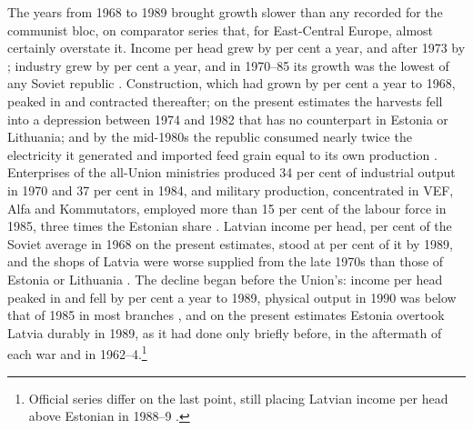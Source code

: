 The years from 1968 to 1989 brought growth slower than any recorded for the communist bloc, on comparator series that, for East-Central Europe, almost certainly overstate it. Income per head grew by  per cent a year, and after 1973 by ; industry grew by  per cent a year, and in 1970--85 its growth was the lowest of any Soviet republic \parencite[304]{krumins_2017_tautsaimnieciba_1960}. Construction, which had grown by  per cent a year to 1968, peaked in  and contracted thereafter; on the present estimates the harvests fell into a depression between 1974 and 1982 that has no counterpart in Estonia or Lithuania; and by the mid-1980s the republic consumed nearly twice the electricity it generated and imported feed grain equal to its own production \parencite[302, 307]{krumins_2017_tautsaimnieciba_1960}. Enterprises of the all-Union ministries produced 34 per cent of industrial output in 1970 and 37 per cent in 1984, and military production, concentrated in VEF, Alfa and Kommutators, employed more than 15 per cent of the labour force in 1985, three times the Estonian share \parencites[34]{gulans_2015_rupnieciba}[103--4]{wbtransitionlatv}[59--61]{upmalis_2015_latvijas}. Latvian income per head,  per cent of the Soviet average in 1968 on the present estimates, stood at  per cent of it by 1989, and the shops of Latvia were worse supplied from the late 1970s than those of Estonia or Lithuania \parencites[304--5]{krumins_2017_tautsaimnieciba_1960}[318]{krumins_2017_gorbacova}[222]{years_of_dependence}[141]{demuth_2000_politics}. The decline began before the Union's: income per head peaked in \lvSOVPEAKyear{} and fell by  per cent a year to 1989, physical output in 1990 was below that of 1985 in most branches \parencite[348--50]{krumins_2017_gorbacova}, and on the present estimates Estonia overtook Latvia durably in 1989, as it had done only briefly before, in the aftermath of each war and in 1962--4.\footnote{Official series differ on the last point, still placing Latvian income per head above Estonian in 1988--9 \parencites[35]{vanselm_1997_economics}[156]{norkus_2023_baltic}.}

